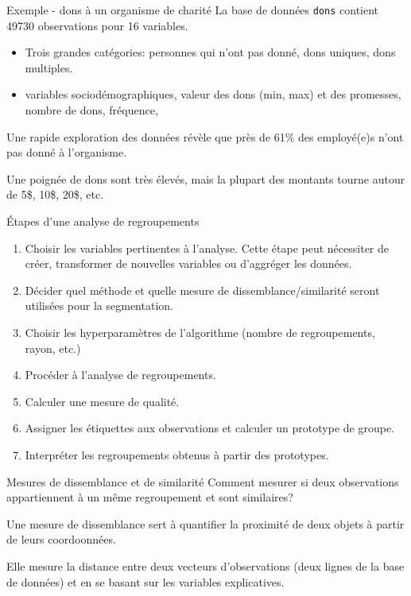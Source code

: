 \documentclass[
  ignorenonframetext,
]{beamer}
\providecommand{\tightlist}{%
  \setlength{\itemsep}{0pt}\setlength{\parskip}{0pt}}\usepackage{longtable,booktabs,array}
\begin{document}
\begin{frame}[fragile]{Exemple - dons à un organisme de charité}
\protect\hypertarget{exemple---dons-uxe0-un-organisme-de-charituxe9}{}
La base de données \texttt{dons} contient 49730 observations pour 16
variables.

\begin{itemize}
\tightlist
\item
  Trois grandes catégories: personnes qui n'ont pas donné, dons uniques,
  dons multiples.
\item
  variables sociodémographiques, valeur des dons (min, max) et des
  promesses, nombre de dons, fréquence,
\end{itemize}

Une rapide exploration des données révèle que près de 61\% des
employé(e)s n'ont pas donné à l'organisme.

Une poignée de dons sont très élevés, mais la plupart des montants
tourne autour de 5\$, 10\$, 20\$, etc.
\end{frame}

\begin{frame}{Étapes d'une analyse de regroupements}
\protect\hypertarget{uxe9tapes-dune-analyse-de-regroupements}{}
\begin{enumerate}
\tightlist
\item
  Choisir les variables pertinentes à l'analyse. Cette étape peut
  nécessiter de créer, transformer de nouvelles variables ou d'aggréger
  les données.
\item
  Décider quel méthode et quelle mesure de dissemblance/similarité
  seront utilisées pour la segmentation.
\item
  Choisir les hyperparamètres de l'algorithme (nombre de regroupements,
  rayon, etc.)
\item
  Procéder à l'analyse de regroupements.
\item
  Calculer une mesure de qualité.
\item
  Assigner les étiquettes aux observations et calculer un prototype de
  groupe.
\item
  Interpréter les regroupements obtenus à partir des prototypes.
\end{enumerate}
\end{frame}

\begin{frame}{Mesures de dissemblance et de similarité}
\protect\hypertarget{mesures-de-dissemblance-et-de-similarituxe9}{}
Comment mesurer si deux observations appartiennent à un même
regroupement et sont similaires?

Une mesure de dissemblance sert à quantifier la proximité de deux objets
à partir de leurs coordoonnées.

Elle mesure la distance entre deux vecteurs d'observations (deux lignes
de la base de données) et en se basant sur les variables explicatives.
\end{frame}
\end{document}
